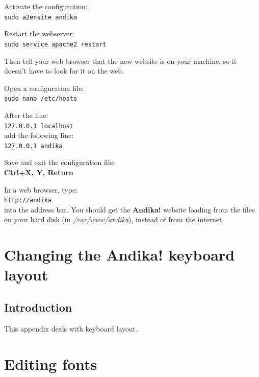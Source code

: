 \documentclass[a4paper,10pt, oneside]{book}
\begin{document}
Activate the configuration:\\
\verb|sudo a2ensite andika|

Restart the webserver:\\
\verb|sudo service apache2 restart|

Then tell your web browser that the new website is on your machine, so it doesn't have to look for it on the web.

Open a configuration file:\\
\verb|sudo nano /etc/hosts|

After the line:\\
\verb|127.0.0.1	localhost|\\
add the following line:\\
\verb|127.0.0.1	andika|

Save and exit the configuration file:\\
\textbf{Ctrl+X, Y, Return}

In a web browser, type:\\
\verb|http://andika|\\
into the address bar.  You should get the \textbf{Andika!} website loading from the files on your hard disk (in \textit{/var/www/andika}), instead of from the internet.


\newpage


\chapter{Changing the \textbf{Andika!} keyboard layout}
\renewcommand{\thesection}{B/\arabic{section}}  %
\setcounter{section}{0}  %

\section{Introduction}
\label{appb:intro}

This appendix deals with keyboard layout.

\newpage


\chapter{Editing fonts}
\renewcommand{\thesection}{C/\arabic{section}}  %
\setcounter{section}{0}  %
\end{document}
